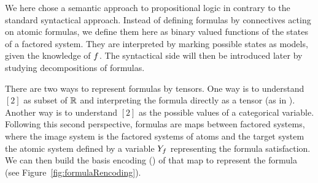 




We here chose a semantic approach to propositional logic in contrary to the standard syntactical approach.
Instead of defining formulas by connectives acting on atomic formulas, we define them here as binary valued functions of the states of a factored system.
They are interpreted by marking possible states as models, given the knowledge of $f$.
The syntactical side will then be introduced later by studying decompositions of formulas.


%	




There are two ways to represent formulas by tensors.
One way is to understand $[2]$ as subset of $\mathbb{R}$ and interpreting the formula directly as a tensor (as in ).
Another way is to understand $[2]$ as the possible values of a categorical variable.
Following this second perspective, formulas are maps between factored systems, where the image system is the factored systems of atoms and the target system the atomic system defined by a variable $Y_{f}$ representing the formula satisfaction.
We can then build the basis encoding () of that map to represent the formula (see Figure~\ref{fig:formulaRencoding}).


